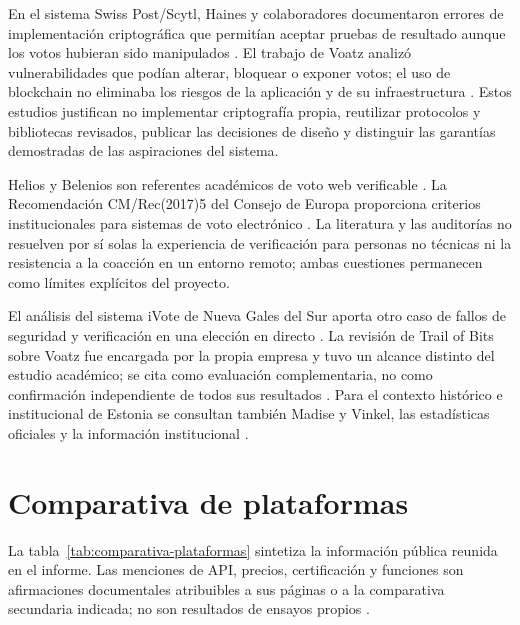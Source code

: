 En el sistema Swiss Post/Scytl, Haines y colaboradores documentaron errores de
implementación criptográfica que permitían aceptar pruebas de resultado aunque
los votos hubieran sido manipulados \citep{haines2020swisspost}. El trabajo de
Voatz analizó vulnerabilidades que podían alterar, bloquear o exponer votos;
el uso de blockchain no eliminaba los riesgos de la aplicación y de su
infraestructura \citep{specter2020voatz}. Estos estudios justifican no
implementar criptografía propia, reutilizar protocolos y bibliotecas revisados,
publicar las decisiones de diseño y distinguir las garantías demostradas de
las aspiraciones del sistema.

Helios y Belenios son referentes académicos de voto web verificable
\citep{adida2008helios,cortier2019belenios}. La Recomendación CM/Rec(2017)5
del Consejo de Europa proporciona criterios institucionales para sistemas de
voto electrónico \citep{coe2017evoting}. La literatura y las auditorías no
resuelven por sí solas la experiencia de verificación para personas no
técnicas ni la resistencia a la coacción en un entorno remoto; ambas cuestiones
permanecen como límites explícitos del proyecto.

El análisis del sistema iVote de Nueva Gales del Sur aporta otro caso de
fallos de seguridad y verificación en una elección en directo
\citep{halderman2015ivote}. La revisión de Trail of Bits sobre Voatz fue
encargada por la propia empresa y tuvo un alcance distinto del estudio
académico; se cita como evaluación complementaria, no como confirmación
independiente de todos sus resultados \citep{trailofbits2020voatz,mitnews2020voatz,vice2020voatz}.
Para el contexto histórico e institucional de Estonia se consultan también
Madise y Vinkel, las estadísticas oficiales y la información institucional
\citep{madise2014estonia,estoniaelections2026,eestonia2026}.

\section{Comparativa de plataformas}
\label{sec:comparativa-plataformas}

La tabla~\ref{tab:comparativa-plataformas} sintetiza la información pública
reunida en el informe. Las menciones de API, precios, certificación y
funciones son afirmaciones documentales atribuibles a sus páginas o a la
comparativa secundaria indicada; no son resultados de ensayos propios
\citep{votedirect2026comparativa,capterra2026voting}.

